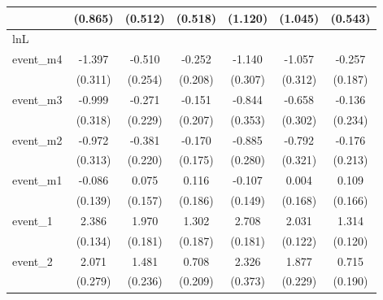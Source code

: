 {\begin{tabular}{l*{6}{c}}
            &     (0.865)         &     (0.512)         &     (0.518)         &     (1.120)         &     (1.045)         &     (0.543)         \\
\hline
lnL         &                     &                     &                     &                     &                     &                     \\
event\_m4    &      -1.397\sym{***}&      -0.510\sym{*}  &      -0.252         &      -1.140\sym{***}&      -1.057\sym{***}&      -0.257         \\
            &     (0.311)         &     (0.254)         &     (0.208)         &     (0.307)         &     (0.312)         &     (0.187)         \\
[1em]
event\_m3    &      -0.999\sym{**} &      -0.271         &      -0.151         &      -0.844\sym{*}  &      -0.658\sym{*}  &      -0.136         \\
            &     (0.318)         &     (0.229)         &     (0.207)         &     (0.353)         &     (0.302)         &     (0.234)         \\
[1em]
event\_m2    &      -0.972\sym{**} &      -0.381         &      -0.170         &      -0.885\sym{**} &      -0.792\sym{*}  &      -0.176         \\
            &     (0.313)         &     (0.220)         &     (0.175)         &     (0.280)         &     (0.321)         &     (0.213)         \\
[1em]
event\_m1    &      -0.086         &       0.075         &       0.116         &      -0.107         &       0.004         &       0.109         \\
            &     (0.139)         &     (0.157)         &     (0.186)         &     (0.149)         &     (0.168)         &     (0.166)         \\
[1em]
event\_1     &       2.386\sym{***}&       1.970\sym{***}&       1.302\sym{***}&       2.708\sym{***}&       2.031\sym{***}&       1.314\sym{***}\\
            &     (0.134)         &     (0.181)         &     (0.187)         &     (0.181)         &     (0.122)         &     (0.120)         \\
[1em]
event\_2     &       2.071\sym{***}&       1.481\sym{***}&       0.708\sym{***}&       2.326\sym{***}&       1.877\sym{***}&       0.715\sym{***}\\
            &     (0.279)         &     (0.236)         &     (0.209)         &     (0.373)         &     (0.229)         &     (0.190)         \\

\end{tabular}}
